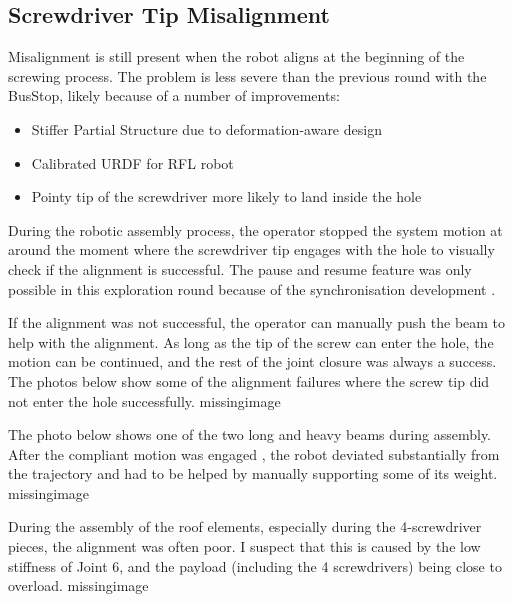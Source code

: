 \subsection{Screwdriver Tip Misalignment}
\label{subsection:exploration_4_screwdriver_tip_misalignment}

Misalignment is still present when the robot aligns at the beginning of the screwing process. The problem is less severe than the previous round with the BusStop, likely because of a number of improvements:
\begin{itemize}
    \item Stiffer Partial Structure due to deformation-aware design 
    \item Calibrated URDF for RFL robot 
    \item Pointy tip of the screwdriver more likely to land inside the hole
\end{itemize}

During the robotic assembly process, the operator stopped the system motion at around the moment where the screwdriver tip engages with the hole to visually check if the alignment is successful. The pause and resume feature was only possible in this exploration round because of the synchronisation development .

If the alignment was not successful, the operator can manually push the beam to help with the alignment. As long as the tip of the screw can enter the hole, the motion can be continued, and the rest of the joint closure was always a success. The photos below show some of the alignment failures where the screw tip did not enter the hole successfully. 
missingimage

The photo below shows one of the two long and heavy beams during assembly. After the compliant motion was engaged , the robot deviated substantially from the trajectory and had to be helped by manually supporting some of its weight.
missingimage

During the assembly of the roof elements, especially during the 4-screwdriver pieces, the alignment was often poor. I suspect that this is caused by the low stiffness of Joint 6, and the payload (including the 4 screwdrivers) being close to overload. 
missingimage

